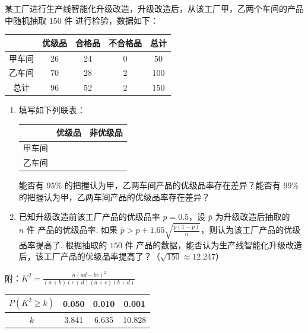 \begin{problem}
某工厂进行生产线智能化升级改造，升级改造后，从该工厂甲，乙两个车间的产品中随机抽取 \( 150\text{ 件} \) 进行检验，数据如下：

\begin{center}
\renewcommand{\arraystretch}{1.3}
\begin{tabular}{c|c|c|c|c}
 & 优级品 & 合格品 & 不合格品 & 总计 \\
\hline
甲车间 & 26 & 24 & 0 & 50 \\
\hline
乙车间 & 70 & 28 & 2 & 100 \\
\hline
总计 & 96 & 52 & 2 & 150
\end{tabular}
\end{center}

\begin{enumerate}
\item 填写如下列联表：

\begin{center}
\renewcommand{\arraystretch}{1.3}
\begin{tabular}{c|c|c}
 & 优级品 & 非优级品 \\
\hline
甲车间 &\fillinblank{}&\fillinblank{} \\
\hline
乙车间 &\fillinblank{}&\fillinblank{}
\end{tabular}
\end{center}

能否有 \( 95\% \) 的把握认为甲，乙两车间产品的优级品率存在差异？能否有 \( 99\% \) 的把握认为甲，乙两车间产品的优级品率存在差异？
\item 已知升级改造前该工厂产品的优级品率 \( p=0.5 \)，设 \( \bar p \) 为升级改造后抽取的 \( n\text{ 件} \) 产品的优级品率. 如果 \( \bar p>p+1.65\sqrt{\frac{p(1-p)}{n}} \)，则认为该工厂产品的优级品率提高了. 根据抽取的 \( 150\text{ 件} \) 产品的数据，能否认为生产线智能化升级改造后，该工厂产品的优级品率提高了？（\( \sqrt{150}\approx 12.247 \)）
\end{enumerate}

附：\( K^2=\frac{n(ad-bc)^2}{(a+b)(c+d)(a+c)(b+d)} \)

\begin{center}
\renewcommand{\arraystretch}{1.3}
\begin{tabular}{c|c|c|c}
\( P\left( K^2\ge k \right) \) & 0.050 & 0.010 & 0.001 \\
\hline
\( k \) & 3.841 & 6.635 & 10.828
\end{tabular}
\end{center}
\end{problem}


